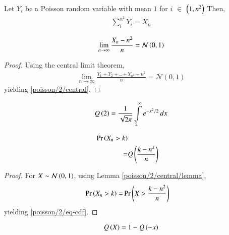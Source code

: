 \begin{lemma}
    Let $Y_i$ be a Poisson random variable with mean $1$ for $i$ $\in$ $\left(1,n^2\right)$
Then, 
\begin{align}
    \sum \limits_{i}^{n^2} Y_i = X_n   
\end{align}

\end{lemma}
\begin{lemma}
    \begin{align}
         \lim  \limits_{n\to \infty} \frac{X_n-n^2}{n} = \mathcal{N}\left(0,1\right)
         \label{poisson/2/central}
    \end{align}
    \label{poisson/2/central/lemma}
\end{lemma}
\begin{proof}
Using the  central limit theorem,
    \begin{align}
        \lim  \limits_{n \to \infty} \frac{Y_1+Y_2+..+Y_{n^2} - n^2}{n} = \mathcal{N}(0,1)
    \end{align}
yielding \eqref{poisson/2/central}.
\end{proof}
\begin{lemma}
    \begin{align}
    Q\left(2\right) = \displaystyle{\frac{1}{\sqrt{2\pi}} \int \limits_2^{\infty} e^{-x^2/2}\,dx}
\end{align}
\label{poisson/2/qfunc/lemma}
\end{lemma}
\begin{lemma}
        \begin{align}
            \Pr\left(X_n>k\right) 
            \\ =& Q\left(\frac{k-n^2}{n}\right)
            \label{poisson/2/eq-cdf}
        \end{align}        
        \label{poisson/2/eq-cdf/lemma}
\end{lemma}
\begin{proof}
    For $X \sim \mathcal{N}\left({0}, {1} \right)$, using Lemma     \ref{poisson/2/central/lemma},
    \begin{align}
        \Pr\left(X_n>k\right) 
            =& \Pr\left(X>\frac{k-n^2}{n}\right)
    \end{align}
    yielding             \eqref{poisson/2/eq-cdf}.
\end{proof}
\begin{lemma}
\begin{align}
    Q\left(X\right)=1-Q\left(-x\right)
    \label{poisson/2/eq-Qx}
\end{align}
\label{poisson/2/eq-Qx/lemma}
\end{lemma}


